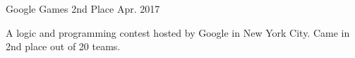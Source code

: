 
\begin{cventry}
    {Google Games 2nd Place}{}
    {Apr. 2017}{}{}
    \begin{cvparagraph}
        A logic and programming contest hosted by Google in New York City. Came in 2nd place out of 20 teams.
    \end{cvparagraph}
\end{cventry}